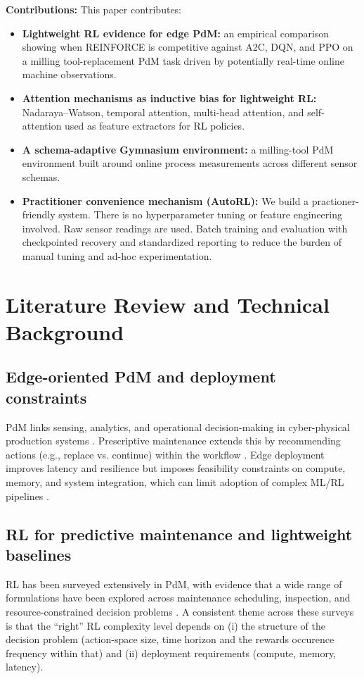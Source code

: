 \documentclass[sn-basic]{sn-jnl} %
\begin{document}
\textbf{Contributions:}
This paper contributes:
\begin{itemize}
	\item \textbf{Lightweight RL evidence for edge PdM:} an empirical comparison showing when \textsc{REINFORCE} is competitive against \textsc{A2C}, \textsc{DQN}, and \textsc{PPO} on a milling tool-replacement PdM task driven by potentially real-time online machine observations.
	\item \textbf{Attention mechanisms as inductive bias for lightweight RL:} Nadaraya--Watson, temporal attention, multi-head attention, and self-attention used as feature extractors for RL policies.
	\item \textbf{A schema-adaptive Gymnasium environment:} a milling-tool PdM environment built around online process measurements across different sensor schemas.
	\item \textbf{Practitioner convenience mechanism (AutoRL):} We build a practioner-friendly system. There is no hyperparameter tuning or feature engineering involved. Raw sensor readings are used. Batch training and evaluation with checkpointed recovery and standardized reporting to reduce the burden of manual tuning and ad-hoc experimentation.
\end{itemize}

\section{Literature Review and Technical Background}
\label{sec:lit_tech}
\subsection{Edge-oriented PdM and deployment constraints}
PdM links sensing, analytics, and operational decision-making in cyber-physical production systems \cite{Compare2020, Zonta2020}. Prescriptive maintenance extends this by recommending actions (e.g., replace vs. continue) within the workflow \cite{Ansari2019}. Edge deployment improves latency and resilience but imposes feasibility constraints on compute, memory, and system integration, which can limit adoption of complex ML/RL pipelines \cite{Njor2024, Pandey2023}.

\subsection{RL for predictive maintenance and lightweight baselines}
RL has been surveyed extensively in PdM, with evidence that a wide range of formulations have been explored across maintenance scheduling, inspection, and resource-constrained decision problems \cite{Siraskar2023, Ogunfowora2023, Zhang2024}. A consistent theme across these surveys is that the ``right'' RL complexity level depends on (i) the structure of the decision problem (action-space size, time horizon and the rewards occurence frequency within that) and (ii) deployment requirements (compute, memory, latency).
\end{document}
